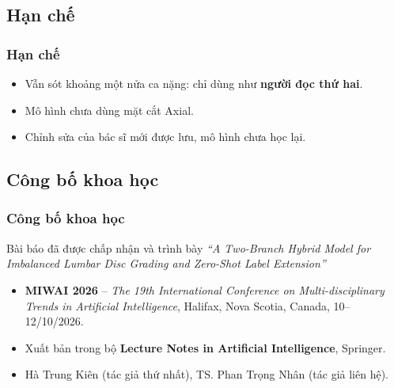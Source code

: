 \documentclass{beamer}
\numberwithin{figure}{section}
\numberwithin{table}{section}
\begin{document}
\subsection{Hạn chế}
\begin{frame}
\frametitle{Hạn chế}
\begin{itemize}
    \item[--] Vẫn sót khoảng một nửa ca nặng: chỉ dùng như \textbf{người đọc thứ hai}.
    \item[--] Mô hình chưa dùng mặt cắt Axial.
    \item[--] Chỉnh sửa của bác sĩ mới được lưu, mô hình chưa học lại.
\end{itemize}
\end{frame}

\subsection{Công bố khoa học}
\begin{frame}
\frametitle{Công bố khoa học}
\begin{block}{Bài báo đã được chấp nhận và trình bày}
\textit{``A Two-Branch Hybrid Model for Imbalanced Lumbar Disc Grading and Zero-Shot Label Extension''}
\end{block}
\begin{itemize}
    \item[--] \textbf{MIWAI 2026} -- \textit{The 19th International Conference on Multi-disciplinary Trends in Artificial Intelligence}, Halifax, Nova Scotia, Canada, 10--12/10/2026.
    \item[--] Xuất bản trong bộ \textbf{Lecture Notes in Artificial Intelligence}, Springer.
    \item[--] Hà Trung Kiên (tác giả thứ nhất), TS. Phan Trọng Nhân (tác giả liên hệ).
\end{itemize}
\end{frame}
\end{document}

